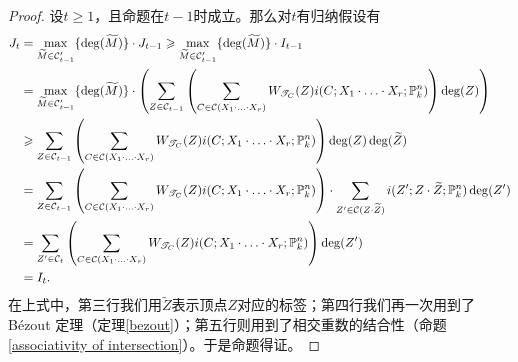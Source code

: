 \begin{proof}
设$t\geqslant 1$，且命题在$t-1$时成立。那么对$t$有归纳假设有
\begin{align}
J_t & = \max_{\widetilde{M} \in \mathcal C'_{t-1}} \{\deg(\widetilde{M})\} \cdot J_{t-1} \geqslant \max_{\widetilde{M}\in \mathcal C'_{t-1}} \{\deg(\widetilde{M})\} \cdot I_{t-1} \\
& = \max_{\widetilde{M}\in \mathcal C'_{t-1}} \{\deg(\widetilde{M})\} \cdot \left( \sum\limits_{Z\in \mathcal{C}_{t-1}} \left( \sum_{C\in\mathcal C(X_1\cdot\ldots\cdot X_r)} W_{\mathscr T_C}(Z)i(C;X_1\cdot\ldots\cdot X_r;\mathbb P^n_k) \right)\deg(Z) \right) \\
& \geqslant \sum\limits_{Z\in \mathcal{C}_{t-1}} \left( \sum_{C\in\mathcal C(X_1\cdot\ldots\cdot X_r)} W_{\mathscr T_C}(Z)i(C;X_1\cdot\ldots\cdot X_r;\mathbb P^n_k) \right) \deg(Z) \deg(\widetilde{Z}) \\
& = \sum\limits_{Z\in \mathcal{C}_{t-1}} \left( \sum_{C\in\mathcal C(X_1\cdot\ldots\cdot X_r)} W_{\mathscr T_C}(Z)i(C;X_1\cdot\ldots\cdot X_r;\mathbb P^n_k) \right) \cdot \sum\limits_{Z'\in \mathcal{C}(Z\cdot \widetilde{Z})} i(Z'; Z\cdot \widetilde{Z}; \mathbb P^n_k) \deg(Z') \\
& = \sum\limits_{Z'\in \mathcal{C}_{t}} \left( \sum_{C\in\mathcal C(X_1\cdot\ldots\cdot X_r)} W_{\mathscr T_C}(Z)i(C;X_1\cdot\ldots\cdot X_r;\mathbb P^n_k) \right) \deg(Z') \\
& = I_t.
\end{align}
在上式中，第三行我们用$\widetilde{Z}$表示顶点$Z$对应的标签；第四行我们再一次用到了B\'ezout 定理（定理\ref{bezout}）；第五行则用到了相交重数的结合性（命题\ref{associativity of intersection}）。于是命题得证。
\end{proof}
